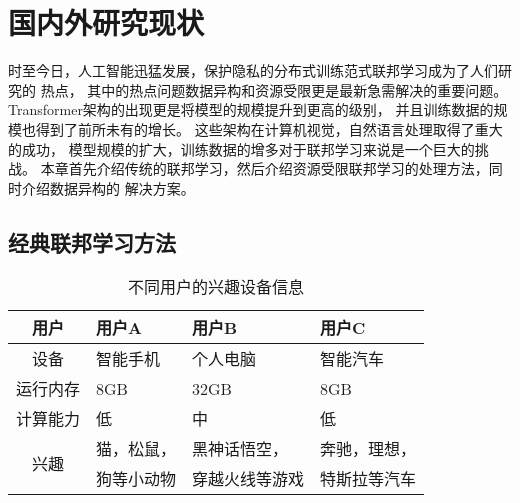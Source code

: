 \section{国内外研究现状}
时至今日，人工智能迅猛发展，保护隐私的分布式训练范式联邦学习成为了人们研究的
热点，
其中的热点问题数据异构和资源受限更是最新急需解决的重要问题。
Transformer架构\cite{vaswani2017attention}的出现更是将模型的规模提升到更高的级别，
并且训练数据的规模也得到了前所未有的增长。
这些架构在计算机视觉\cite{bai2023qwen}，自然语言处理\cite{yang2024qwen2}取得了重大的成功，
模型规模的扩大，训练数据的增多对于联邦学习来说是一个巨大的挑战。
本章首先介绍传统的联邦学习，然后介绍资源受限联邦学习的处理方法，同时介绍数据异构的
解决方案。


\subsection{经典联邦学习方法}
\begin{table}[htbp]
    \caption{\label{tab:users_info_fl}不同用户的兴趣设备信息}
    \begin{tabularx}{\linewidth}{c|X<{\centering}|X<{\centering}|X<{\centering}}
        \hline
        用户 & 用户A & 用户B & 用户C \\ \hline
        设备 & 智能手机 & 个人电脑 & 智能汽车 \\ \hline
        运行内存 & 8GB & 32GB & 8GB \\ \hline
        计算能力 & 低 & 中 & 低 \\ \hline
        \multirow{2}{*}{兴趣} & 猫，松鼠， & 黑神话悟空， & 奔驰，理想， \\ 
        & 狗等小动物 & 穿越火线等游戏 & 特斯拉等汽车 \\ \hline
    \end{tabularx}
\end{table}

